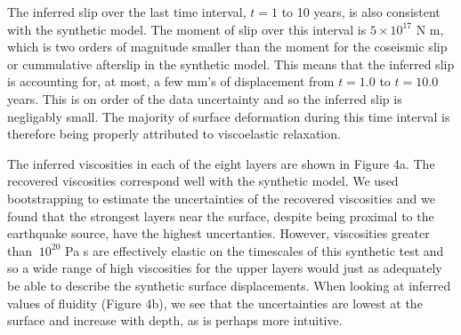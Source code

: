 \documentclass[extra]{gji}
\begin{document}
The inferred slip over the last time interval, $t=1$ to 10 years, is
also consistent with the synthetic model.  The moment of slip over
this interval is $5\times 10^{17}$ N m, which is two orders of
magnitude smaller than the moment for the coseismic slip or
cummulative afterslip in the synthetic model.  This means that the
inferred slip is accounting for, at most, a few mm's of displacement
from $t=1.0$ to $t=10.0$ years.  This is on order of the data
uncertainty and so the inferred slip is negligably small.  The
majority of surface deformation during this time interval is therefore
being properly attributed to viscoelastic relaxation.

The inferred viscosities in each of the eight layers are shown in
Figure 4a.  The recovered viscosities correspond well with the
synthetic model.  We used bootstrapping to estimate the uncertainties
of the recovered viscosities and we found that the strongest layers
near the surface, despite being proximal to the earthquake source,
have the highest uncertanties.  However, viscosities greater than
$~10^{20}$ Pa s are effectively elastic on the timescales of this
synthetic test and so a wide range of high viscosities for the upper
layers would just as adequately be able to describe the synthetic
surface displacements.  When looking at inferred values of fluidity
(Figure 4b), we see that the uncertainties are lowest at the surface
and increase with depth, as is perhaps more intuitive.

\end{document}
